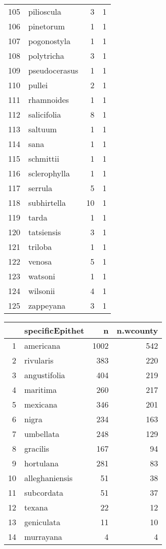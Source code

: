 \documentclass{article}\usepackage[]{graphicx}\usepackage[]{color}
\begin{document}
\begin{table}[ht]
\begin{tabular}{rlrr}
  105 & pilioscula &   3 &   1 \\ 
  106 & pinetorum &   1 &   1 \\ 
  107 & pogonostyla &   1 &   1 \\ 
  108 & polytricha &   3 &   1 \\ 
  109 & pseudocerasus &   1 &   1 \\ 
  110 & pullei &   2 &   1 \\ 
  111 & rhamnoides &   1 &   1 \\ 
  112 & salicifolia &   8 &   1 \\ 
  113 & saltuum &   1 &   1 \\ 
  114 & sana &   1 &   1 \\ 
  115 & schmittii &   1 &   1 \\ 
  116 & sclerophylla &   1 &   1 \\ 
  117 & serrula &   5 &   1 \\ 
  118 & subhirtella &  10 &   1 \\ 
  119 & tarda &   1 &   1 \\ 
  120 & tatsiensis &   3 &   1 \\ 
  121 & triloba &   1 &   1 \\ 
  122 & venosa &   5 &   1 \\ 
  123 & watsoni &   1 &   1 \\ 
  124 & wilsonii &   4 &   1 \\ 
  125 & zappeyana &   3 &   1 \\ 
   \hline
\end{tabular}
\end{table}
\begin{table}[ht]
\centering
\begin{tabular}{rlrr}
  \hline
 & specificEpithet & n & n.wcounty \\ 
  \hline
1 & americana & 1002 & 542 \\ 
  2 & rivularis & 383 & 220 \\ 
  3 & angustifolia & 404 & 219 \\ 
  4 & maritima & 260 & 217 \\ 
  5 & mexicana & 346 & 201 \\ 
  6 & nigra & 234 & 163 \\ 
  7 & umbellata & 248 & 129 \\ 
  8 & gracilis & 167 &  94 \\ 
  9 & hortulana & 281 &  83 \\ 
  10 & alleghaniensis &  51 &  38 \\ 
  11 & subcordata &  51 &  37 \\ 
  12 & texana &  22 &  12 \\ 
  13 & geniculata &  11 &  10 \\ 
  14 & murrayana &   4 &   4 \\ 
   \hline
\end{tabular}
\end{table}
\end{document}

